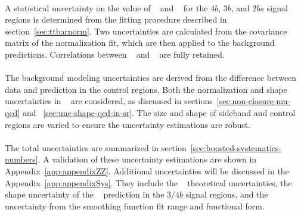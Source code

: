 \paragraph{}
A statistical uncertainty on the value of \muqcd~ and \alphatt~ for the $4b$, $3b$, and $2bs$ signal regions is determined from the fitting procedure described in section~\ref{sec:ttbarnorm}.
Two uncertainties are calculated from the covariance matrix of the normalization fit, which are then applied to the background predictions.
Correlations between \alphatt~ and \muqcd~ are fully retained.

\paragraph{}
The background modeling uncertainties are derived from the difference between data and prediction in the control regions.
Both the normalization and shape uncertainties in \mtwoJ~ are considered, as discussed in sections~\ref{sec:non-closure-mu-qcd} and ~\ref{sec:unc-shape-qcd-in-sr}. 
The size and shape of sideband and control regions are varied to ensure the uncertainty estimations are robust.

\paragraph{}
The total uncertainties are summarized in section~\ref{sec:boosted-systematics-numbers}.
A validation of these uncertainty estimations are shown in Appendix~\ref{app:appendixZZ}.
Additional uncertainties will be discussed in the Appendix~\ref{app:appendixSys}. 
They include the \ttbar~ theoretical uncertainties, the shape uncertainty of the \ttbar~ prediction in the $3/4b$ signal regions, and the uncertainty from the smoothing function fit range and functional form.

